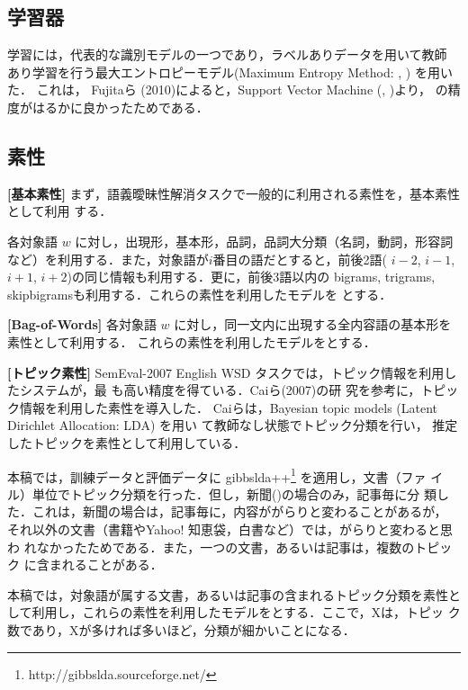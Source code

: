 \documentclass[japanese]{jnlp_1.4}
\newcommand{\PN}{}
\newcommand{\bl}{}
\newcommand{\bows}{}
\newcommand{\tp}[1]{}
\newcommand{\MEM}{}
\newcommand{\SVM}{}
\begin{document}
\subsection{学習器} 
\label{sec:exp}

学習には，代表的な識別モデルの一つであり，ラベルありデータを用いて教師
あり学習を行う最大エントロピーモデル(Maximum Entropy Method: \MEM, 
\cite{Nigam:Lafferty:McCallum:1999}) を用いた．
これは，
Fujitaら (2010)によると，Support Vector
Machine (\SVM, \cite{libsvm})より，
\MEM{}
の精度がはるかに良かったためである．


\subsection{素性} 
\label{sec:fea}

{\bf [基本素性]}
まず，語義曖昧性解消タスクで一般的に利用される素性を，基本素性として利用
する．

各対象語 $w$ に対し，出現形，基本形，品詞，品詞大分類（名詞，動詞，形容詞
など）を利用する．また，対象語が$i$番目の語だとすると，前後2語(
$i - 2$, $i - 1$, $i + 1$, $i + 2$)の同じ情報も利用する．更に，前後3語以内の
bigrams, trigrams, skipbigramsも利用する．これらの素性を利用したモデルを
\bl{}とする．

{\bf [Bag-of-Words]}
各対象語 $w$ に対し，同一文内に出現する全内容語の基本形を素性として利用する．
これらの素性を利用したモデルを\bows{}とする．


{\bf [トピック素性]}
SemEval-2007 English WSD タスクでは，トピック情報を利用したシステムが，最
も高い精度を得ている\cite{Cai:Lee:Teh:2007}．Caiら(2007)の研
究を参考に，トピック情報を利用した素性を導入した．
Caiらは，Bayesian topic models (Latent Dirichlet Allocation: LDA) を用い
て教師なし状態でトピック分類を行い，
推定したトピックを素性として利用している．

本稿では，訓練データと評価データに
gibbslda++\footnote{http://gibbslda.sourceforge.net/} を適用し，文書（ファ
イル）単位でトピック分類を行った．但し，新聞(\PN)の場合のみ，記事毎に分
類した．これは，新聞の場合は，記事毎に，内容ががらりと変わることがあるが，
それ以外の文書（書籍やYahoo! 知恵袋，白書など）では，がらりと変わると思わ
れなかったためである．また，一つの文書，あるいは記事は，複数のトピック
に含まれることがある．

本稿では，対象語が属する文書，あるいは記事の含まれるトピック分類を素性と
して利用し，これらの素性を利用したモデルを\tp{X}とする．ここで，Xは，トピッ
ク数であり，Xが多ければ多いほど，分類が細かいことになる．
\end{document}
